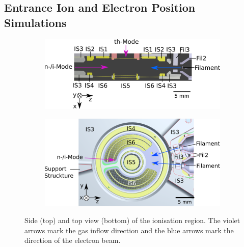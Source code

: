 	
	\subsection{Entrance Ion and Electron Position Simulations}
	
	\begin{figure}[h] %
		\begin{subfigure}[t]{\textwidth}
			\centering
			\includegraphics[width=.8\textwidth]{Experiments/PFMEntrance_Side_Schema.png}
		\end{subfigure}
		\par\bigskip
		\begin{subfigure}[b]{\textwidth}
			\centering
			\includegraphics[width=.85\textwidth]{Experiments/PFMEntrance_Top_Schema.png}
		\end{subfigure}
		\caption{Side (top) and top view (bottom) of the ionisation region. The violet arrows mark the gas inflow direction and the blue arrows mark the direction of the electron beam.}
		\label{fig:PFMentrSideTopSchemas}
	\end{figure}

